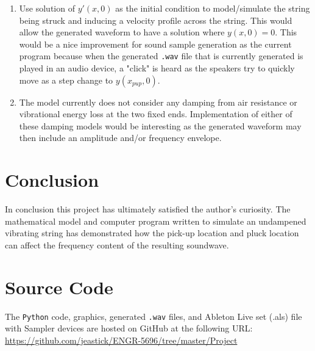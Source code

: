 \documentclass[%
 reprint,
 amsmath,amssymb,
 aps,
]{revtex4-1}
\begin{document}
\begin{enumerate}
  \item Use solution of $y'(x,0)$ as the initial condition to model/simulate the string being struck and inducing a velocity profile across the string. This would allow the generated waveform to have a solution where $y(x,0)=0$. This would be a nice improvement for sound sample generation as the current program because when the generated \texttt{.wav} file that is currently generated is played in an audio device, a "click" is heard as the speakers try to quickly move as a step change to $y(x_{pup},0)$.
  \item The model currently does not consider any damping from air resistance or vibrational energy loss at the two fixed ends. Implementation of either of these damping models would be interesting as the generated waveform may then include an amplitude and/or frequency envelope. 
\end{enumerate}

\section{\label{sec:level1}Conclusion}
In conclusion this project has ultimately satisfied the author's curiosity. The mathematical model and computer program written to simulate an undampened vibrating string has demonstrated how the pick-up location and pluck location can affect the frequency content of the resulting soundwave.\\

\section{\label{sec:level1}Source Code}
The \texttt{Python} code, graphics, generated \texttt{.wav} files, and Ableton Live set (.als) file with Sampler devices are hosted on GitHub at the following URL: 
\url{https://github.com/jeastick/ENGR-5696/tree/master/Project}
\end{document}

